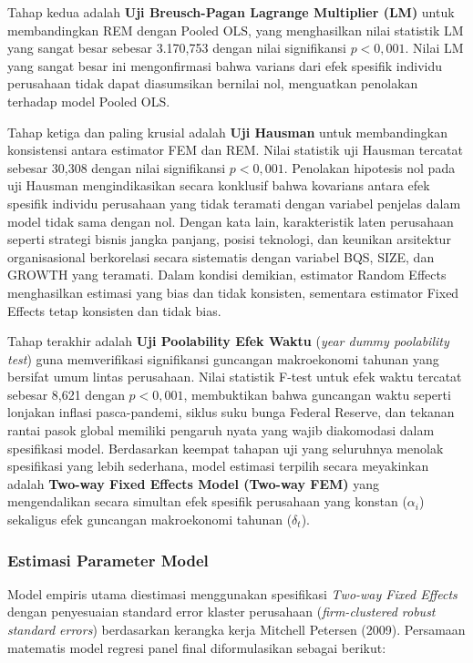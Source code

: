 \documentclass[12pt,a4paper]{article}
\begin{document}
Tahap kedua adalah \textbf{Uji Breusch-Pagan Lagrange Multiplier (LM)}
untuk membandingkan REM dengan Pooled OLS, yang menghasilkan nilai
statistik LM yang sangat besar sebesar 3.170,753 dengan nilai
signifikansi \(p < 0{,}001\). Nilai LM yang sangat besar ini
mengonfirmasi bahwa varians dari efek spesifik individu perusahaan tidak
dapat diasumsikan bernilai nol, menguatkan penolakan terhadap model
Pooled OLS.

Tahap ketiga dan paling krusial adalah \textbf{Uji Hausman} untuk
membandingkan konsistensi antara estimator FEM dan REM. Nilai statistik
uji Hausman tercatat sebesar 30,308 dengan nilai signifikansi
\(p < 0{,}001\). Penolakan hipotesis nol pada uji Hausman
mengindikasikan secara konklusif bahwa kovarians antara efek spesifik
individu perusahaan yang tidak teramati dengan variabel penjelas dalam
model tidak sama dengan nol. Dengan kata lain, karakteristik laten
perusahaan seperti strategi bisnis jangka panjang, posisi teknologi, dan
keunikan arsitektur organisasional berkorelasi secara sistematis dengan
variabel BQS, SIZE, dan GROWTH yang teramati. Dalam kondisi demikian,
estimator Random Effects menghasilkan estimasi yang bias dan tidak
konsisten, sementara estimator Fixed Effects tetap konsisten dan tidak
bias.

Tahap terakhir adalah \textbf{Uji Poolability Efek Waktu} (\emph{year
dummy poolability test}) guna memverifikasi signifikansi guncangan
makroekonomi tahunan yang bersifat umum lintas perusahaan. Nilai
statistik F-test untuk efek waktu tercatat sebesar 8,621 dengan
\(p < 0{,}001\), membuktikan bahwa guncangan waktu seperti lonjakan
inflasi pasca-pandemi, siklus suku bunga Federal Reserve, dan tekanan
rantai pasok global memiliki pengaruh nyata yang wajib diakomodasi dalam
spesifikasi model. Berdasarkan keempat tahapan uji yang seluruhnya
menolak spesifikasi yang lebih sederhana, model estimasi terpilih secara
meyakinkan adalah \textbf{Two-way Fixed Effects Model (Two-way FEM)}
yang mengendalikan secara simultan efek spesifik perusahaan yang konstan
(\(\alpha_i\)) sekaligus efek guncangan makroekonomi tahunan
(\(\delta_t\)).

\subsubsection{Estimasi Parameter
Model}\label{estimasi-parameter-model-1}

Model empiris utama diestimasi menggunakan spesifikasi \emph{Two-way
Fixed Effects} dengan penyesuaian standard error klaster perusahaan
(\emph{firm-clustered robust standard errors}) berdasarkan kerangka
kerja Mitchell Petersen (2009). Persamaan matematis model regresi panel
final diformulasikan sebagai berikut:
\end{document}
